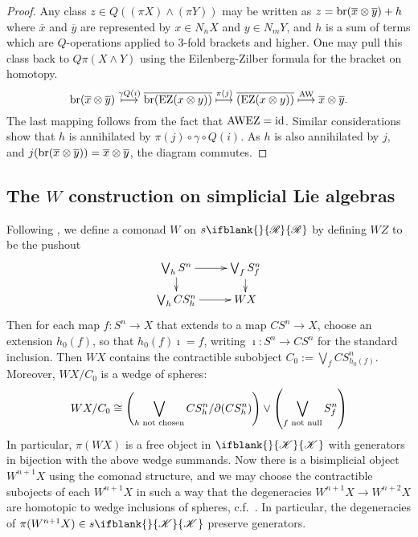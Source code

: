 \documentclass[10pt]{article}
\newcommand{\PRLie}[1]%
{\ifblank{#1}{\scrR}{\scrR^{#1}}}
\newcommand{\LL}[1]{\ifblank{#1}{\scrK}{\scrK^{#1}}}
\begin{document}
\begin{backgroundOnMultiplicativity}
\begin{proof}
Any class $z\in Q((\pi X)\wedge (\pi Y))$ may be written as $z=\textup{br}(\overline{x}\otimes\overline{y})+h$ where $\overline{x}$ and $\overline{y}$ are represented by $x\in N_nX$ and $y\in N_mY$, and $h$ is a sum of terms which are $Q$-operations applied to 3-fold brackets and higher. One may pull this class back to $Q\pi(X\wedge Y)$ using the Eilenberg-Zilber formula for the bracket on homotopy.
\[\textup{br}(\overline{x}\otimes\overline{y})\overset{\gamma\circ Q(i)}{\mapsto}\overline{\textup{br}(\textup{EZ}(x\otimes y))}\overset{\pi(j)}{\mapsto}\overline{(\textup{EZ}(x\otimes y))}\overset{\textup{AW}}{\mapsto}\overline{x}\otimes \overline{y}.\]
The last mapping follows from the fact that $\textup{AW}\circ\textup{EZ}=\textup{id}$.
Similar considerations show that $h$ is annihilated by $\pi(j)\circ\gamma\circ Q(i)$. As $h$ is also annihilated by $j$, and $j(\textup{br}(\overline{x}\otimes\overline{y}))=\overline{x}\otimes\overline{y}$, the diagram commutes.
\end{proof}
\subsection{The $W$ construction on simplicial Lie algebras}
Following \cite{Blanc_Stover-Groth_SS.pdf}, we define a comonad $W$ on $s\PRLie{}$ by defining $WZ$ to be the pushout
\[\xymatrix@R=4mm{
\bigvee_{h}S^n
\ar[r]\ar[d]
&%
\bigvee_{f}S^n_f\ar[d]\\%
\bigvee_{h}CS^n_h
\ar[r]&%
WX%
}\]
Then for each map $f:S^n\to X$ that extends to a map $CS^n\to X$, choose an extension $h_0(f)$, so that $h_0(f)\imath=f$, writing $\imath:S^n\to CS^n$ for the standard inclusion. Then $WX$ contains the contractible subobject $C_0:=\bigvee_f CS^n_{h_0(f)}$. Moreover, $WX/C_0$ is a wedge of spheres:
\[WX/C_0\cong \left(\bigvee_{h\textup{ not chosen}}CS^n_h/\partial(CS^n_h)\right)\vee\left(\bigvee_{f\textup{ not null}}S^n_f\right)\]
In particular, $\pi(WX)$ is a free object in $\LL{}$ with generators in bijection with the above wedge summands. Now there is a bisimplicial object $W^{n+1}X$ using the comonad structure, and we may choose the contractible subojects of each $W^{n+1}X$ in such a way that the degeneracies $W^{n+1}X\to W^{n+2}X$ are homotopic to wedge inclusions of spheres, c.f.\ \cite{StoverVanKampen.pdf}. In particular, the degeneracies of $\pi(W^{n+1}X)\in s\LL{}$ preserve generators.


\end{backgroundOnMultiplicativity}
\end{document}
